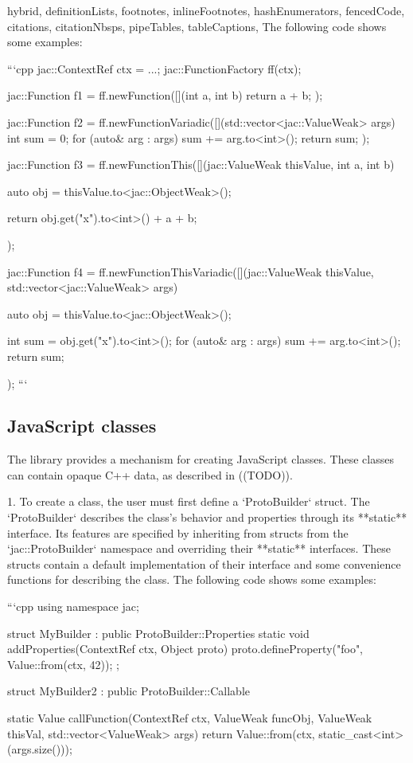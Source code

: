\documentclass[
  digital,
  oneside,
  nosansbold,
  nocolorbold,
  lof,
  lot
]{fithesis4}
\begin{document}
\begin{markdown*}{%
  hybrid,
  definitionLists,
  footnotes,
  inlineFootnotes,
  hashEnumerators,
  fencedCode,
  citations,
  citationNbsps,
  pipeTables,
  tableCaptions,
}
The following code shows some examples:

```cpp
jac::ContextRef ctx = ...;
jac::FunctionFactory ff(ctx);

jac::Function f1 = ff.newFunction([](int a, int b) { return a + b; });

jac::Function f2 = ff.newFunctionVariadic([](std::vector<jac::ValueWeak> args) {
    int sum = 0;
    for (auto& arg : args) {
        sum += arg.to<int>();
    }
    return sum;
});

jac::Function f3 = ff.newFunctionThis([](jac::ValueWeak thisValue, int a, int b) {
    auto obj = thisValue.to<jac::ObjectWeak>();

    return obj.get("x").to<int>() + a + b;
});

jac::Function f4 = ff.newFunctionThisVariadic([](jac::ValueWeak thisValue, std::vector<jac::ValueWeak> args) {
    auto obj = thisValue.to<jac::ObjectWeak>();

    int sum = obj.get("x").to<int>();
    for (auto& arg : args) {
        sum += arg.to<int>();
    }
    return sum;
});
```

\subsection{JavaScript classes}

The library provides a mechanism for creating JavaScript classes. These classes can contain opaque C++ data, as described in ((TODO)).

  1. To create a class, the user must first define a `ProtoBuilder` struct. The `ProtoBuilder` describes the class's behavior and properties through its **static** interface. Its features are specified by inheriting from structs from the `jac::ProtoBuilder` namespace and overriding their **static** interfaces. These structs contain a default implementation of their interface and some convenience functions for describing the class. The following code shows some examples:

```cpp
using namespace jac;

struct MyBuilder : public ProtoBuilder::Properties {
    static void addProperties(ContextRef ctx, Object proto) {
        proto.defineProperty("foo", Value::from(ctx, 42));
    }
};

struct MyBuilder2 : public ProtoBuilder::Callable {
    static Value callFunction(ContextRef ctx, ValueWeak funcObj, ValueWeak thisVal, std::vector<ValueWeak> args) {
        return Value::from(ctx, static_cast<int>(args.size()));
    }

}
\end{markdown*}
\end{document}

